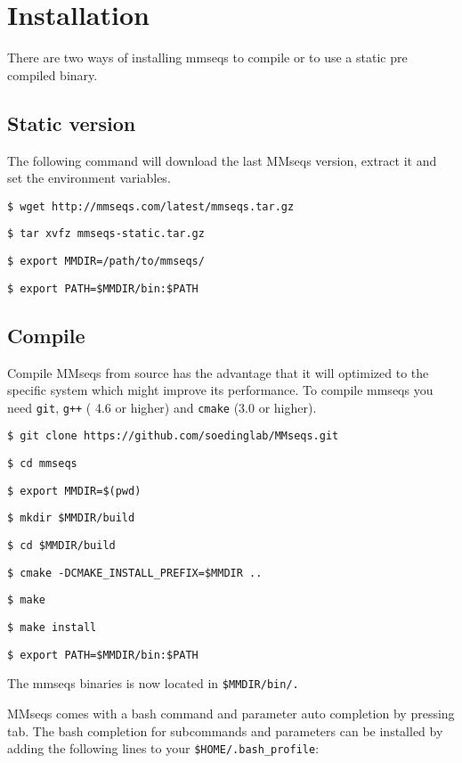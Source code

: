 \documentclass[11pt,a4paper]{report}
\begin{document}
\section{Installation}

There are two ways of installing mmseqs to compile or to use a static pre compiled binary. 

\subsection{Static version}

The following command will download the last MMseqs version, extract it and set the environment variables.

\texttt{\$ wget http://mmseqs.com/latest/mmseqs.tar.gz}

\texttt{\$ tar xvfz mmseqs-static.tar.gz}

\texttt{\$ export MMDIR=/path/to/mmseqs/}

\texttt{\$ export PATH=\$MMDIR/bin:\$PATH}

\subsection{Compile}

Compile MMseqs from source has the advantage that it will optimized to the specific system which might improve its performance.
To compile mmseqs you need  \texttt{git}, \texttt{g++} ( 4.6 or higher) and \texttt{cmake} (3.0 or higher). 

\texttt{\$ git clone https://github.com/soedinglab/MMseqs.git}

\texttt{\$ cd mmseqs}

\texttt{\$ export MMDIR=\$(pwd)}

\texttt{\$ mkdir \$MMDIR/build}

\texttt{\$ cd \$MMDIR/build}

\texttt{\$ cmake -DCMAKE\_INSTALL\_PREFIX=\$MMDIR ..}

\texttt{\$ make }

\texttt{\$ make install }

\texttt{\$ export PATH=\$MMDIR/bin:\$PATH}

The mmseqs binaries is now located in \texttt{\$MMDIR/bin/.}

MMseqs comes with a bash command and parameter auto completion by pressing tab. 
The bash completion for subcommands and parameters can be installed by adding the following lines to your \texttt{\$HOME/.bash\_profile}:
\end{document}
